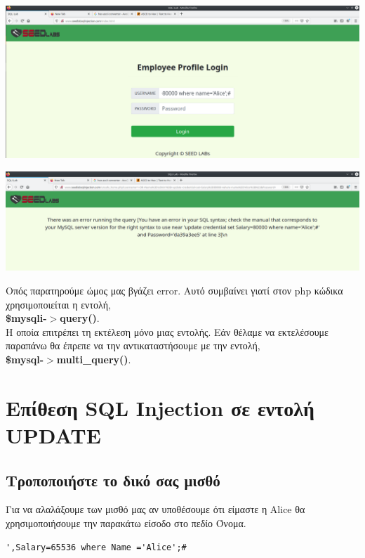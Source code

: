 \begin{center}
			\includegraphics[width=1\textwidth]{image/d2.6.PNG}		
\end{center}

\begin{center}
			\includegraphics[width=1\textwidth]{image/d2.6.1.PNG}		
\end{center}
\noindent
Οπός παρατηρούμε ώμος μας βγάζει error. Αυτό συμβαίνει γιατί στον php κώδικα 
χρησιμοποιείται η εντολή, \\ \textbf{\$mysqli-$>$query()}.\\ Η οποία επιτρέπει τη εκτέλεση μόνο μιας εντολής.
Εάν θέλαμε να εκτελέσουμε παραπάνω θα έπρεπε να την αντικαταστήσουμε με την εντολή,\\ \textbf{\$mysql-$>$multi\_query()}.

\section{Επίθεση SQL Injection σε εντολή UPDATE}

\subsection{Τροποποιήστε το δικό σας μισθό}
\noindent
Για να αλαλάξουμε των μισθό μας αν υποθέσουμε ότι είμαστε η Alice θα χρησιμοποιήσουμε
την παρακάτω είσοδο στο πεδίο Όνομα.
\begin{center}
	\begin{lstlisting}
',Salary=65536 where Name ='Alice';#
	\end{lstlisting}	
\end{center}

